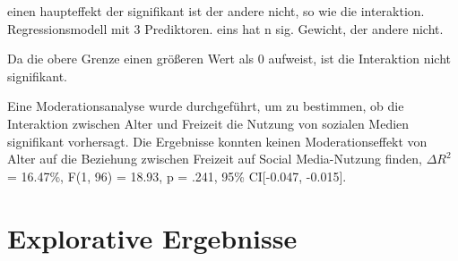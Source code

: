 einen haupteffekt der signifikant ist der andere nicht, so wie die interaktion. Regressionsmodell mit 3 Prediktoren. eins hat n sig. Gewicht, der andere nicht.

Da die obere Grenze einen größeren Wert als 0 aufweist, ist die Interaktion nicht signifikant.

Eine Moderationsanalyse wurde durchgeführt, um zu bestimmen, ob die Interaktion zwischen Alter und Freizeit die Nutzung von sozialen Medien signifikant vorhersagt. Die Ergebnisse konnten keinen Moderationseffekt von Alter auf die Beziehung zwischen Freizeit auf Social Media-Nutzung finden, $\Delta R^{2}$ = 16.47\%, F(1, 96) = 18.93, p = .241, 95\% CI[-0.047, -0.015].


\section{Explorative Ergebnisse}    \label{sec_4.4}

